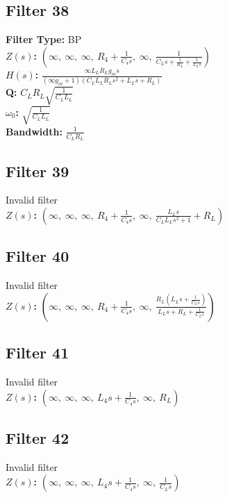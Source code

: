 \documentclass{article}
\begin{document}
\subsection*{Filter 38}
\textbf{Filter Type:} BP \\ 
\textbf{$Z(s)$:} $\left( \infty, \  \infty, \  \infty, \  R_{4} + \frac{1}{C_{4} s}, \  \infty, \  \frac{1}{C_{L} s + \frac{1}{R_{L}} + \frac{1}{L_{L} s}}\right)$ \\ 
\textbf{$H(s)$:} $\frac{\infty L_{L} R_{L} g_{m} s}{\left(\infty g_{m} + 1\right) \left(C_{L} L_{L} R_{L} s^{2} + L_{L} s + R_{L}\right)}$ \\ 
\textbf{Q:} $C_{L} R_{L} \sqrt{\frac{1}{C_{L} L_{L}}}$ \\ 
\textbf{$\omega_0$:} $\sqrt{\frac{1}{C_{L} L_{L}}}$ \\ 
\textbf{Bandwidth:} $\frac{1}{C_{L} R_{L}}$ \\ 
\subsection*{Filter 39}
Invalid filter \\ 
\textbf{$Z(s)$:} $\left( \infty, \  \infty, \  \infty, \  R_{4} + \frac{1}{C_{4} s}, \  \infty, \  \frac{L_{L} s}{C_{L} L_{L} s^{2} + 1} + R_{L}\right)$ \\ 
\subsection*{Filter 40}
Invalid filter \\ 
\textbf{$Z(s)$:} $\left( \infty, \  \infty, \  \infty, \  R_{4} + \frac{1}{C_{4} s}, \  \infty, \  \frac{R_{L} \left(L_{L} s + \frac{1}{C_{L} s}\right)}{L_{L} s + R_{L} + \frac{1}{C_{L} s}}\right)$ \\ 
\subsection*{Filter 41}
Invalid filter \\ 
\textbf{$Z(s)$:} $\left( \infty, \  \infty, \  \infty, \  L_{4} s + \frac{1}{C_{4} s}, \  \infty, \  R_{L}\right)$ \\ 
\subsection*{Filter 42}
Invalid filter \\ 
\textbf{$Z(s)$:} $\left( \infty, \  \infty, \  \infty, \  L_{4} s + \frac{1}{C_{4} s}, \  \infty, \  \frac{1}{C_{L} s}\right)$ \\ 
\end{document}
